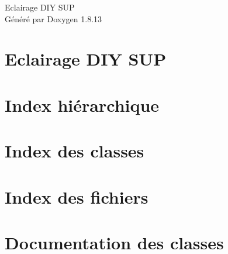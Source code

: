 \documentclass[twoside]{book}
\newcommand{\+}{\discretionary{\mbox{\scriptsize$\hookleftarrow$}}{}{}}
\newcommand{\clearemptydoublepage}{%
  \newpage{\pagestyle{empty}\cleardoublepage}%
}
\begin{document}
\hypersetup{pageanchor=false,
             bookmarksnumbered=true,
             pdfencoding=unicode
            }
\begin{titlepage}
\vspace*{7cm}
\begin{center}%
{\Large Eclairage D\+IY S\+UP }\\
\vspace*{1cm}
{\large Généré par Doxygen 1.8.13}\\
\end{center}
\end{titlepage}
\clearemptydoublepage
{}
\tableofcontents
\clearemptydoublepage
{}
\hypersetup{pageanchor=true}

\chapter{Eclairage D\+IY S\+UP}
\label{index}\hypertarget{index}{}
\chapter{Index hiérarchique}

\chapter{Index des classes}

\chapter{Index des fichiers}

\chapter{Documentation des classes}







































\end{document}

